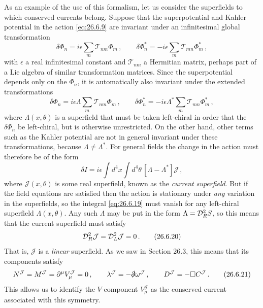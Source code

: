 As an example of the use of this formalism, let us consider the superfields to
which conserved currents belong. Suppose that the superpotential and Kahler
potential in the action \eqref{eq:26.6.9} are invariant under an infinitesimal
global transformation
\begin{equation}
  \delta\Phi_n=i\epsilon\sum_m\mathcal{T}_{nm}\Phi_m\,,
  \qquad
  \delta\Phi_n^*=-i\epsilon\sum_m\mathcal{T}_{mn}\Phi_m^*\,,
  \tag{26.6.17}\label{eq:26.6.17}
\end{equation}
with \(\epsilon\) a real infinitesimal constant and \(\mathcal{T}_{nm}\) a
Hermitian matrix, perhaps part of a Lie algebra of similar transformation
matrices. Since the superpotential depends only on the \(\Phi_n\), it is
automatically also invariant under the extended transformations
\begin{equation}
  \delta\Phi_n=i\epsilon\Lambda\sum_m\mathcal{T}_{nm}\Phi_m\,,
  \qquad
  \delta\Phi_n^*=-i\epsilon\Lambda^*
    \sum_m\mathcal{T}_{mn}\Phi_m^*\,,
  \tag{26.6.18}\label{eq:26.6.18}
\end{equation}
where \(\Lambda(x,\theta)\) is a superfield that must be taken left-chiral in
order that the \(\delta\Phi_n\) be left-chiral, but is otherwise unrestricted.
On the other hand, other terms such as the Kahler potential are not in
general invariant under these transformations, because
\(\Lambda\neq\Lambda^*\). For general fields the change in the action must
therefore be of the form
\begin{equation}
  \delta I
  =i\epsilon\int d^4x\int d^4\theta\,[\Lambda-\Lambda^*]\mathcal{J}\,,
  \tag{26.6.19}\label{eq:26.6.19}
\end{equation}
where \(\mathcal{J}(x,\theta)\) is some real superfield, known as the
\emph{current superfield}. But if the field equations are satisfied then the
action is stationary under \emph{any} variation in the superfields, so the
integral \eqref{eq:26.6.19} must vanish for any left-chiral superfield
\(\Lambda(x,\theta)\). Any such \(\Lambda\) may be put in the form
\(\Lambda=\SuperD_R^2S\), so this means that the current superfield must
satisfy
\begin{equation}
  \SuperD_R^2\mathcal{J}=\SuperD_L^2\mathcal{J}=0\,.
  \tag{26.6.20}\label{eq:26.6.20}
\end{equation}
That is, \(\mathcal{J}\) is a \emph{linear} superfield. As we saw in Section
26.3, this means that its components satisfy
\begin{equation}
  N^{\mathcal{J}}=M^{\mathcal{J}}
  =\partial^\mu V_\mu^{\mathcal{J}}=0\,,
  \qquad
  \lambda^{\mathcal{J}}=-\sl{\partial}\omega^{\mathcal{J}}\,,
  \qquad
  D^{\mathcal{J}}=-\Box C^{\mathcal{J}}\,.
  \tag{26.6.21}\label{eq:26.6.21}
\end{equation}
This allows us to identify the \(V\)-component \(V_\mu^{\mathcal{J}}\) as the
conserved current associated with this symmetry.

